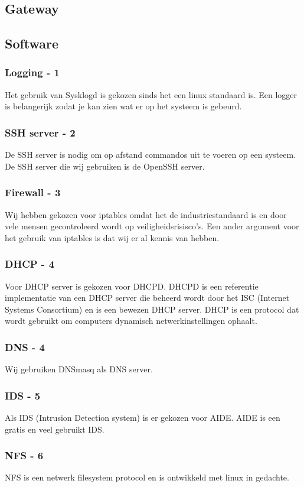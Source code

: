 \documentclass[12pt]{article}
\begin{document}
\subsection{Gateway}
\subsection{Software}
\subsubsection{Logging - 1}
Het gebruik van Sysklogd is gekozen sinds het een linux standaard is. Een logger is belangerijk zodat je kan zien wat er op het systeem is gebeurd.
\subsubsection{SSH server - 2}
De SSH server is nodig om op afstand commandos uit te voeren op een systeem. De SSH server die wij gebruiken is de OpenSSH server.
\subsubsection{Firewall - 3}
Wij hebben gekozen voor iptables omdat het de industriestandaard is en door vele mensen gecontroleerd wordt op veiligheidsrisisco's. Een ander argument voor het gebruik van iptables is dat wij er al kennis van hebben.
\subsubsection{DHCP - 4}
Voor DHCP server is gekozen voor DHCPD. DHCPD is een referentie implementatie van een DHCP server die beheerd wordt door het ISC (Internet Systems Consortium) en is een bewezen DHCP server. DHCP is een protocol dat wordt gebruikt om computers dynamisch netwerkinstellingen ophaalt.
\subsubsection{DNS - 4}
Wij gebruiken DNSmasq als DNS server.
\subsubsection{IDS - 5}
Als IDS (Intrusion Detection system) is er gekozen voor AIDE. AIDE is een gratis en veel gebruikt IDS.
\subsubsection{NFS - 6}
NFS is een netwerk filesystem protocol en is ontwikkeld met linux in gedachte.
\end{document}
